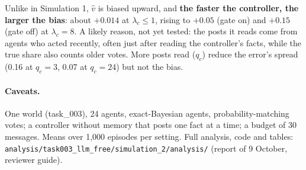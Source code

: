 \documentclass[10pt,a4paper]{article}
\begin{document}
Unlike in Simulation 1, $\hat v$ is biased upward, and \textbf{the faster the controller, the
larger the bias}: about $+0.014$ at $\lambda_c \le 1$, rising to $+0.05$ (gate on) and $+0.15$
(gate off) at $\lambda_c = 8$. A likely reason, not yet tested: the posts it reads come from agents who
acted recently, often just after reading the controller's facts, while the true share also
counts older votes. More posts read ($q_c$) reduce the error's spread (0.16 at $q_c = 3$, 0.07
at $q_c = 24$) but not the bias.

\paragraph{Caveats.} One world (task\_003), 24 agents, exact-Bayesian agents,
probability-matching votes; a controller without memory that posts one fact at a time; a
budget of 30 messages. Means over 1{,}000 episodes per setting. Full analysis, code and
tables: \texttt{analysis/task003\_llm\_free/simulation\_2/analysis/} (report of 9 October,
reviewer guide).
\end{document}
